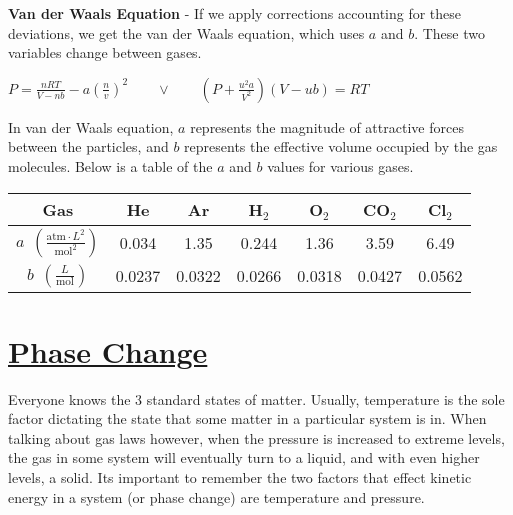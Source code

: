 \documentclass{article}
\begin{document}
\vspace{10pt}
\noindent\textbf{Van der Waals Equation} - If we apply corrections accounting for these deviations, we get the van der Waals equation, which uses $a$ and $b$. These two variables change between gases.
\begin{qq}

	\begin{center}
		$P=\frac{nRT}{V-nb}-a\left(\frac{n}{v}\right)^2 \quad\quad \lor \qquad \left(P+\frac{u^2a}{V^2}\right)\left(V-ub\right)=RT$
	\end{center}

\end{qq}

\pagebreak

\newcommand{\Tstrut}{\rule{0pt}{3.1ex}}         %
\newcommand{\Bstrut}{\rule[-2ex]{0pt}{0pt}}   %
\newcommand{\TBstrut}{\Tstrut\Bstrut}            %

\noindent In van der Waals equation, $a$ represents the magnitude of attractive forces between the particles, and $b$ represents the effective volume occupied by the gas molecules. Below is a table of the $a$ and $b$ values for various gases.

\begin{center}
	\begin{tabular}{ccccccc}
		\hline
		\textbf{Gas}                                                  & \textcolor{pag!40}{He} & \textcolor{pag!40}{Ar} & \textcolor{pag!40}{H$_2$} & \textcolor{pag!40}{O$_2$} & \textcolor{pag!40}{CO$_2$} & \textcolor{pag!40}{Cl$_2$} \\
		\hline
		$a\:\: \left(\frac{\text{atm}\cdot L^2}{\text{mol}^2}\right)$ & 0.034                  & 1.35                   & 0.244                     & 1.36                      & 3.59                       & 6.49 \TBstrut              \\
		$b\:\: \left(\frac{L}{\text{mol}}\right)$                     & 0.0237                 & 0.0322                 & 0.0266                    & 0.0318                    & 0.0427                     & 0.0562 \TBstrut            \\
		\hline
	\end{tabular}
\end{center}

\section*{\LARGE\uline{Phase Change}}
Everyone knows the 3 standard states of matter. Usually, temperature is the sole factor dictating the state that some matter in a particular system is in. When talking about gas laws however, when the pressure is increased to extreme levels, the gas in some system will eventually turn to a liquid, and with even higher levels, a solid. Its important to remember the two factors that effect kinetic energy in a system (or phase change) are temperature and pressure.
\vspace{20pt}
\end{document}
